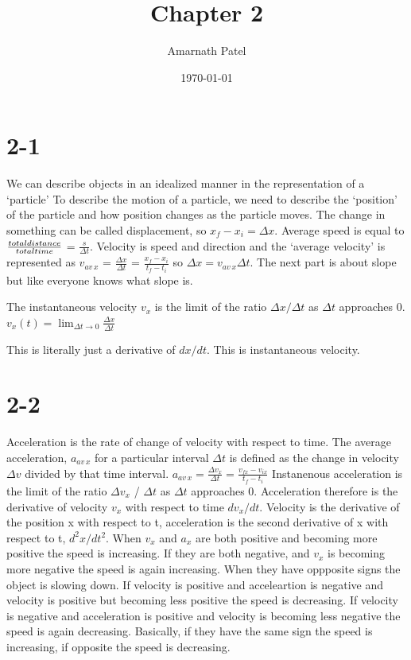 \documentclass{article}
\begin{document}
\title{Chapter 2}
\author{Amarnath Patel}
\date{\today}

\maketitle

\section{2-1}

We can describe objects in an idealized manner in the representation of a `particle'
To describe the motion of a particle, we need to describe the `position' of the particle and how position changes as the particle moves.
The change in something can be called displacement, so $x_f - x_i = \Delta x$. Average speed is equal to $\frac{total \space distance}{total \space time}$ = $\frac{s}{\Delta t}$.
Velocity is speed and direction and the `average velocity' is represented as $v_{av \, x}$ = $\frac{\Delta x}{\Delta t}$ = $\frac{x_f - x_i}{t_f - t_i}$ so $\Delta x = v_{av \, x} \Delta t$.
The next part is about slope but like everyone knows what slope is.

The instantaneous velocity $v_x$ is the limit of the ratio $\Delta x / \Delta t$ as $\Delta t$ approaches 0.
$v_x(t) = \lim_{\Delta t \to 0} \frac{\Delta x}{\Delta t}$

This is literally just a derivative of $dx/dt$. This is instantaneous velocity.

\section{2-2}

Acceleration is the rate of change of velocity with respect to time. The average acceleration, $a_{av \, x}$ for a particular interval $\Delta t$ is defined as the change in velocity $\Delta v$ divided by that time interval.
$a_{av \, x} = \frac{\Delta v_x}{\Delta t} = \frac{v_{fx} - v_{ix}}{t_f - t_i}$
Instanenous acceleration is the limit of the ratio $\Delta v_x$ / $\Delta t$ as $\Delta t$ approaches 0.
Acceleration therefore is the derivative of velocity $v_x$ with respect to time $dv_x / dt$. Velocity is the derivative of the position x with respect to t, acceleration is the second derivative of x with respect to t, $d^2x / dt^2$. 
When $v_x$ and $a_x$ are both positive and becoming more positive the speed is increasing. If they are both negative, and $v_x$ is becoming more negative the speed is again increasing. When they have oppposite signs the object is slowing down. If velocity is positive and acceleartion is negative and velocity is positive but becoming less positive the speed is decreasing. If velocity is negative and acceleration is positive and velocity is becoming less negative the speed is again decreasing. Basically, if they have the same sign the speed is increasing, if opposite the speed is decreasing.
\end{document}
